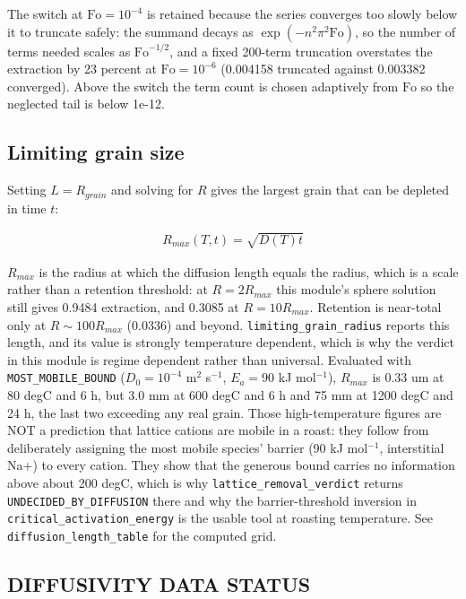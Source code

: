 \documentclass[10pt,a4paper,twoside]{report}
\begin{document}
The switch at $\mathrm{Fo} = 10^{-4}$ is retained because the series converges too slowly below it to truncate safely: the summand decays as $\exp(-n^2\pi^2\mathrm{Fo})$, so the number of terms needed scales as $\mathrm{Fo}^{-1/2}$, and a fixed 200-term truncation overstates the extraction by 23 percent at $\mathrm{Fo} = 10^{-6}$ (0.004158 truncated against 0.003382 converged). Above the switch the term count is chosen adaptively from $\mathrm{Fo}$ so the neglected tail is below 1e-12.

\subsection*{Limiting grain size}

Setting $L = R_{grain}$ and solving for $R$ gives the largest grain that can be depleted in time $t$:

\begin{equation*}
\begin{gathered}
R_{max}(T, t) = \sqrt{D(T) t}
\end{gathered}
\end{equation*}

$R_{max}$ is the radius at which the diffusion length equals the radius, which is a scale rather than a retention threshold: at $R = 2R_{max}$ this module's sphere solution still gives 0.9484 extraction, and 0.3085 at $R = 10R_{max}$. Retention is near-total only at $R \sim 100R_{max}$ (0.0336) and beyond. \texttt{limiting\_grain\_radius} reports this length, and its value is strongly temperature dependent, which is why the verdict in this module is regime dependent rather than universal. Evaluated with \texttt{MOST\_MOBILE\_BOUND} ($D_0 = 10^{-4}$ m$^{2}$ s$^{-1}$, $E_a = 90$ kJ mol$^{-1}$), $R_{max}$ is 0.33 um at 80 degC and 6 h, but 3.0 mm at 600 degC and 6 h and 75 mm at 1200 degC and 24 h, the last two exceeding any real grain. Those high-temperature figures are NOT a prediction that lattice cations are mobile in a roast: they follow from deliberately assigning the most mobile species' barrier (90 kJ mol$^{-1}$, interstitial Na+) to every cation. They show that the generous bound carries no information above about 200 degC, which is why \texttt{lattice\_removal\_verdict} returns \texttt{UNDECIDED\_BY\_DIFFUSION} there and why the barrier-threshold inversion in \texttt{critical\_activation\_energy} is the usable tool at roasting temperature. See \texttt{diffusion\_length\_table} for the computed grid.

\subsection*{DIFFUSIVITY DATA STATUS}
\end{document}
